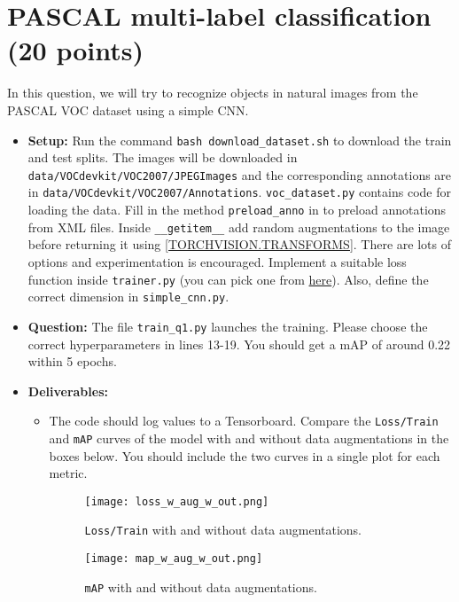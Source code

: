 \documentclass[11pt,addpoints,answers]{exam}
\numberwithin{equation}{section} %
\numberwithin{figure}{section} %
\numberwithin{table}{section} %
\begin{document}
\section{PASCAL multi-label classification (20 points)}
In this question, we will try to recognize objects in natural images from the PASCAL VOC dataset using a simple CNN.
\begin{itemize}
    \item \textbf{Setup:}  Run the command \texttt{bash download\_dataset.sh} to download the train and test splits. The images will be downloaded in 
\texttt{data/VOCdevkit/VOC2007/JPEGImages} and the corresponding annotations are in {\texttt{data/VOCdevkit/VOC2007/Annotations}}. \texttt{voc\_dataset.py} contains code for loading the data. Fill in the method \texttt{preload\_anno} in to preload annotations from XML files. Inside \texttt{\_\_getitem\_\_} add random augmentations to the image before returning it using \href{https://pytorch.org/vision/stable/transforms.html}{[TORCHVISION.TRANSFORMS]}. There are lots of options and experimentation is encouraged. Implement a suitable loss function inside \texttt{trainer.py} (you can pick one from \href{https://pytorch.org/docs/stable/nn.html#loss-functions}{here}). Also, define the correct dimension in \texttt{simple\_cnn.py}. 
\item \textbf{Question:} The file \texttt{train\_q1.py} launches the training. Please choose the correct hyperparameters in lines 13-19. You should get a mAP of around 0.22 within 5 epochs.
\item \textbf{Deliverables:} 
    \begin{itemize}
        \item The code should log values to a Tensorboard. Compare the \texttt{Loss/Train} and \texttt{mAP} curves of the model with and without data augmentations in the boxes below. You should include the two curves in a single plot for each metric.

        \begin{figure}[H]
            \centering
            \texttt{[image: loss\_w\_aug\_w\_out.png]}
            \caption{\texttt{Loss/Train} with and without data augmentations.}
            \label{fig:q1_1_compare_loss}
        \end{figure}
        
        \begin{figure}[H]
            \centering
            \texttt{[image: map\_w\_aug\_w\_out.png]}
            \caption{\texttt{mAP} with and without data augmentations.}
            \label{fig:q1_1_compare_map}
        \end{figure}
        

\end{itemize}
\end{itemize}
\end{document}
